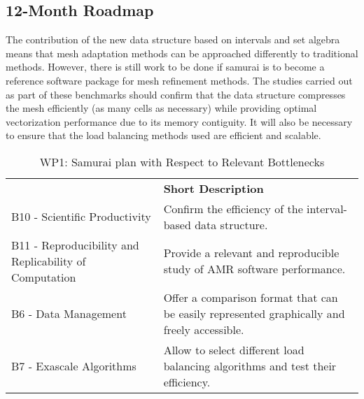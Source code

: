 \subsection{12-Month Roadmap}
\label{sec:WP1:Samurai:roadmap}

The contribution of the new data structure based on intervals and set algebra means that mesh adaptation methods can be approached differently to traditional methods. However, there is still work to be done if samurai is to become a reference software package for mesh refinement methods. The studies carried out as part of these benchmarks should confirm that the data structure compresses the mesh efficiently (as many cells as necessary) while providing optimal vectorization performance due to its memory contiguity. It will also be necessary to ensure that the load balancing methods used are efficient and scalable.

\begin{table}[h!]
    \centering


    \centering
    {
        \setlength{\parindent}{0pt}
        \def\arraystretch{1.25}
        {
            \fontsize{9}{11}\selectfont
            \begin{tabular}{!{\color{numpexgray}\vrule}p{.25\linewidth}!{\color{numpexgray}\vrule}p{.6885\linewidth}!{\color{numpexgray}\vrule}}

     &  {\rule{0pt}{2.5ex}\color{white}\bf Short Description }\\

    B10 - Scientific Productivity & Confirm the efficiency of the interval-based data structure. \\
    B11 - Reproducibility and Replicability of Computation & Provide a relevant and reproducible study of AMR software performance. \\
    B6 - Data Management & Offer a comparison format that can be easily represented graphically and freely accessible. \\
    B7 - Exascale Algorithms & Allow to select different load balancing algorithms and test their efficiency.  \\
\end{tabular}
        }
    }
    \caption{WP1: Samurai plan with Respect to Relevant Bottlenecks}
    \label{tab:WP1:Samurai:bottlenecks}
\end{table}